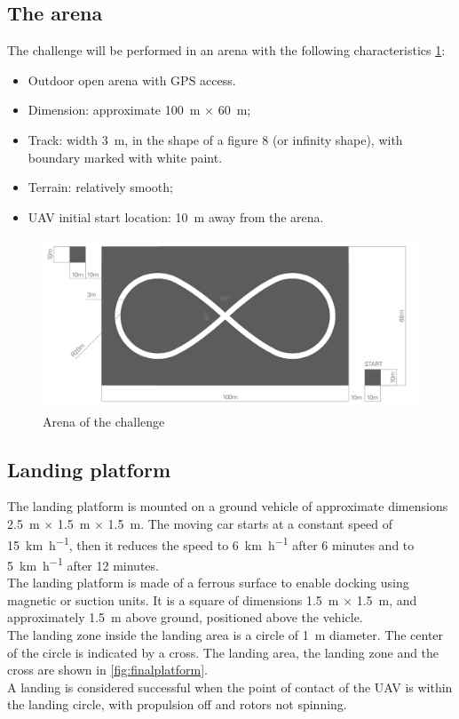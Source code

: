 \subsection{The arena}
The challenge will be performed in an arena with the following characteristics \ref{fig:arenachallenge}:
\begin{itemize}
\item Outdoor open arena with GPS access.
\item Dimension: approximate  \SI{100}{\meter} $\times$  \SI{60}{\meter};
\item Track: width  \SI{3}{\meter}, in the shape of a figure 8 (or infinity shape), with boundary marked with white paint.
\item Terrain: relatively smooth;
\item UAV initial start location:  \SI{10}{\meter} away from the arena.
\end{itemize}

\begin{figure}[!htbp]
    \centering
    \includegraphics[width=1\textwidth]{img/arena.png}
    \caption{Arena of the challenge}
    \label{fig:arenachallenge}
\end{figure}

\subsection{Landing platform}
The landing platform is mounted on a ground vehicle of approximate dimensions  \SI{2.5}{\meter} $\times$  \SI{1.5}{\meter} $\times$  \SI{1.5}{\meter}. The moving car starts at a constant speed of \SI{15}{\km \per \hour}, then it reduces the speed to \SI{6}{\km \per \hour} after 6 minutes and to \SI{5}{\km \per \hour} after 12 minutes.\\
The landing platform is made of a ferrous surface to enable docking using magnetic or suction units.
It is a square of dimensions \SI{1.5}{\meter} $\times$  \SI{1.5}{\meter}, and approximately \SI{1.5}{\meter} above ground, positioned above the vehicle. \\
The landing zone inside the landing area is a circle of \SI{1}{\meter} diameter. The center of the circle is indicated by a cross. The landing area, the landing zone and the cross are shown in \ref{fig:finalplatform}.\\
A landing is considered successful when the point of contact of the UAV is within the landing circle, with propulsion off and rotors not spinning.\\


